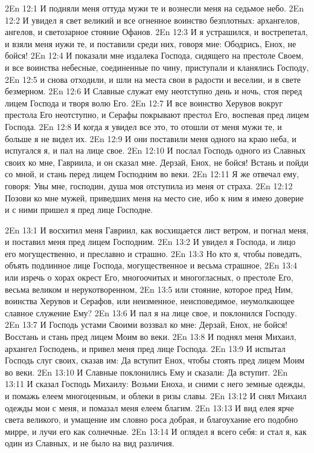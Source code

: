 \vs 2En 12:1
И подняли меня оттуда мужи те и вознесли меня на седьмое небо.
\vs 2En 12:2
И увидел я свет великий и все огненное воинство безплотных: архангелов, ангелов, и светозарное стояние Офанов.
\vs 2En 12:3
И я устрашился, и вострепетал, и взяли меня иужи те, и поставили среди них, говоря мне: Ободрись, Енох, не бойся!
\vs 2En 12:4
И показали мне издалека Господа, сидящего на престоле Своем, и все воинства небесные, соединенные по чину, приступали и кланялись Господу,
\vs 2En 12:5
и снова отходили, и шли на места свои в радости и веселии, и в свете безмерном.
\vs 2En 12:6
И Славные служат ему неотступно день и ночь, стоя перед лицем Господа и творя волю Его.
\vs 2En 12:7
И все воинство Херувов вокруг престола Его неотступно, и Серафы покрывают престол Его, воспевая пред лицем Господа.
\vs 2En 12:8
И когда я увидел все это, то отошли от меня мужи те, и больше я не видел их.
\vs 2En 12:9
И они поставили меня одного на краю неба, и испугался я, и пал на лице свое.
\vs 2En 12:10
И послал Господь одного из Славных своих ко мне, Гавриила, и он сказал мне. Дерзай, Енох, не бойся! Встань и пойди со мной, и стань перед лицем Господним во веки.
\vs 2En 12:11
Я же отвечал ему, говоря: Увы мне, господин, душа моя отступила из меня от страха.
\vs 2En 12:12
Позови ко мне мужей, приведших меня на место сие, ибо к ним я имею доверие и с ними пришел я пред лице Господне.

\vs 2En 13:1
И восхитил меня Гавриил, как восхищается лист ветром, и погнал меня, и поставил меня пред лицем Господним.
\vs 2En 13:2
И увидел я Господа, и лицо его могущественно, и преславно и страшно.
\vs 2En 13:3
Но кто я, чтобы поведать, объять подлинное лице Господа, могущественное и весьма страшное,
\vs 2En 13:4
или изречь о хорах окрест Его, многоочитых и многогласных, о престоле Его, весьма великом и нерукотворенном,
\vs 2En 13:5
или стояние, которое пред Ним, воинства Херувов и Серафов, или неизменное, неисповедимое, неумолкающее славное служение Ему?
\vs 2En 13:6
И пал я на лице свое, и поклонился Господу.
\vs 2En 13:7
И Господь устами Своими воззвал ко мне: Дерзай, Енох, не бойся! Восстань и стань пред лицем Моим во веки.
\vs 2En 13:8
И поднял меня Михаил, архангел Господень, и привел меня пред лице Господа.
\vs 2En 13:9
И испытал Господь слуг своих, сказав им: Да вступит Енох, чтобы стоять пред лицем Моим во веки.
\vs 2En 13:10
И Славные поклонились Ему и сказали: Да вступит.
\vs 2En 13:11
И сказал Господь Михаилу: Возьми Еноха, и сними с него земные одежды, и помажь елеем многоценным, и облеки в ризы славы.
\vs 2En 13:12
И снял Михаил одежды мои с меня, и помазал меня елеем благим.
\vs 2En 13:13
И вид елея ярче света великого, и умащение им словно роса добрая, и благоухание его подобно мирре, и лучи его как солнечные.
\vs 2En 13:14
И оглядел я всего себя: и стал я, как один из Славных, и не было на вид различия.

